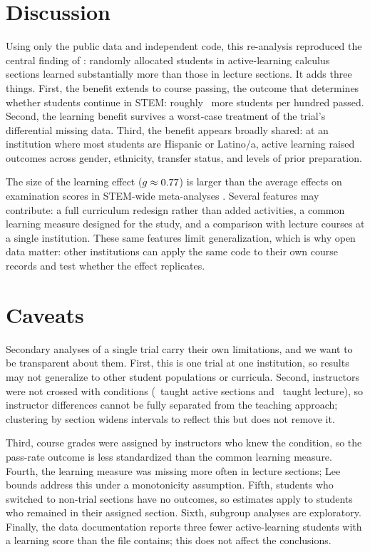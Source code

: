 \documentclass[10pt,twocolumn,letterpaper]{article}
\begin{document}
\section{Discussion}\label{sec:discussion}

Using only the public data and independent code, this re-analysis reproduced the central finding of \citet{kramer2023}: randomly allocated students in active-learning calculus sections learned substantially more than those in lecture sections. It adds three things. First, the benefit extends to course passing, the outcome that determines whether students continue in STEM: roughly \PerHundred\ more students per hundred passed. Second, the learning benefit survives a worst-case treatment of the trial's differential missing data. Third, the benefit appears broadly shared: at an institution where most students are Hispanic or Latino/a, active learning raised outcomes across gender, ethnicity, transfer status, and levels of prior preparation.

The size of the learning effect ($g \approx 0.77$) is larger than the average effects on examination scores in STEM-wide meta-analyses \citep{freeman2014}. Several features may contribute: a full curriculum redesign rather than added activities, a common learning measure designed for the study, and a comparison with lecture courses at a single institution. These same features limit generalization, which is why open data matter: other institutions can apply the same code to their own course records and test whether the effect replicates.

\section{Caveats}\label{sec:caveats}

Secondary analyses of a single trial carry their own limitations, and we want to be transparent about them. First, this is one trial at one institution, so results may not generalize to other student populations or curricula. Second, instructors were not crossed with conditions (\NinstrAct\ taught active sections and \NinstrLec\ taught lecture), so instructor differences cannot be fully separated from the teaching approach; clustering by section widens intervals to reflect this but does not remove it.

Third, course grades were assigned by instructors who knew the condition, so the pass-rate outcome is less standardized than the common learning measure. Fourth, the learning measure was missing more often in lecture sections; Lee bounds address this under a monotonicity assumption. Fifth, students who switched to non-trial sections have no outcomes, so estimates apply to students who remained in their assigned section. Sixth, subgroup analyses are exploratory. Finally, the data documentation reports three fewer active-learning students with a learning score than the file contains; this does not affect the conclusions.
\end{document}
